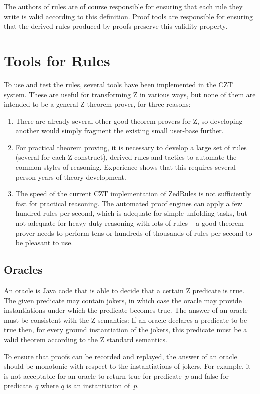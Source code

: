 \documentclass{entcs}
\begin{document}
The authors of rules are of course responsible for ensuring that each
rule they write is valid according to this definition.  Proof tools
are responsible for ensuring that the derived rules produced by proofs
preserve this validity property.


\section{Tools for Rules} \label{sec:tools}

To use and test the rules, several tools have been implemented
in the CZT system.  These are useful for transforming Z in various
ways, but none of them are intended to be a general Z theorem prover, 
for three reasons:
\begin{enumerate}
\item There are already several other good theorem provers for Z, so
  developing another would simply fragment the existing small user-base
  further.
\item For practical theorem proving, it is necessary to develop a large set
  of rules (several for each Z construct), derived rules and tactics to
  automate the common styles of reasoning.  Experience shows that this
  requires several person years of theory development. 
\item The speed of the current CZT implementation of ZedRules is not
  sufficiently fast for practical reasoning.  The automated proof engines can
  apply a few hundred rules per second, which is adequate for simple unfolding
  tasks, but not adequate for heavy-duty reasoning with lots of rules --
  a good theorem prover needs to perform tens or hundreds of thousands of
  rules per second to be pleasant to use.
\end{enumerate}


\subsection{Oracles}

An oracle is Java code that is able to decide that a certain Z
predicate is true.  The given predicate may contain jokers, in which
case the oracle may provide instantiations under which the predicate
becomes true.  The answer of an oracle must be consistent with the Z
semantics: If an oracle declares a predicate to be true then, for
every ground instantiation of the jokers, this predicate must be a
valid theorem according to the Z standard semantics.

To ensure that proofs can be recorded and replayed, the answer of an
oracle should be monotonic with respect to the instantiations of
jokers.  For example, it is not acceptable for an oracle to return
true for predicate~$p$ and false for predicate~$q$ where $q$ is an
instantiation of~$p$.
\end{document}
